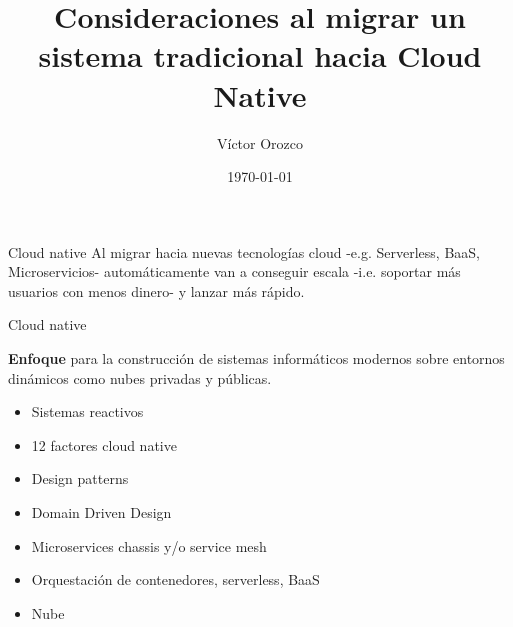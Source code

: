 \documentclass[aspectratio=169]{beamer}
\title{Consideraciones al migrar un sistema tradicional hacia Cloud Native}
\author{Víctor Orozco}
\institute{Nabenik}
\date{\today}
\begin{document}
{
    \frame{\titlepage}
}

\begin{frame}{Cloud native}
Al migrar hacia nuevas tecnologías cloud -e.g. Serverless, BaaS, Microservicios- automáticamente van a conseguir escala -i.e. soportar más usuarios con menos dinero-  y lanzar más rápido.
\end{frame}


\begin{frame}{Cloud native}

\textbf{Enfoque} para la construcción de sistemas informáticos modernos sobre entornos dinámicos como nubes privadas y públicas.

	\begin{itemize}
		\item Sistemas reactivos
		\item 12 factores cloud native
        \item Design patterns
        \item Domain Driven Design
		\item Microservices chassis y/o service mesh
        \item Orquestación de contenedores, serverless, BaaS
        \item Nube
	\end{itemize}

\end{frame}
\end{document}
